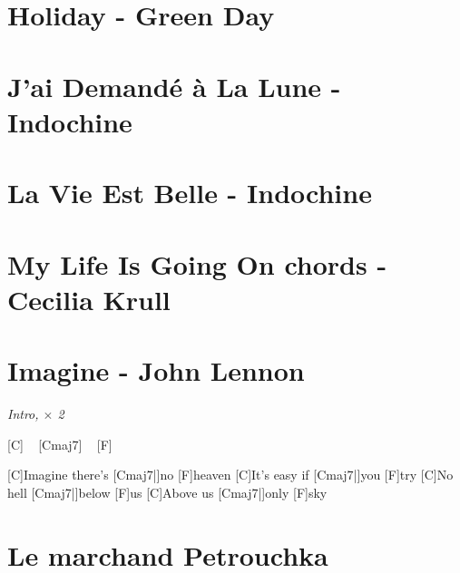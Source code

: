 \documentclass{guitartabs}
\begin{document}
\section*{Holiday - Green Day}
\begin{guitar}

\end{guitar}


\section*{J'ai Demandé à La Lune - Indochine}
\begin{guitar}

\end{guitar}

\section*{La Vie Est Belle - Indochine}
\begin{guitar}

\end{guitar}


\section{My Life Is Going On chords - Cecilia Krull }
\begin{guitar}

\end{guitar}


\section{Imagine - John Lennon}

\begin{guitar}


\emph{Intro, $\times$ 2}%

[C] ~ [Cmaj7]  ~ [F]  ~  %

[C]Imagine there's [Cmaj7|]{no} [F]heaven
[C]It's easy if [Cmaj7|]{you} [F]try
[C]No hell [Cmaj7|]{below} [F]us
[C]Above us [Cmaj7|]{only} [F]sky
\end{guitar}


\section{Le marchand Petrouchka}
\begin{guitar}

\end{guitar}
\end{document}
